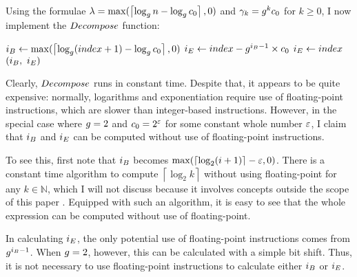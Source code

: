 Using the formulae $\lambda = \max(\left\lceil \log_{g} n - \log_{g} c_0 \right\rceil, 0)$ and $\gamma_k = g^k c_0$ for $k \geq 0$, I now implement the $\FuncDecompose$ function:

\begin{algorithm}[H]
	\caption{\TextHelperFunction}
	\begin{algorithmic}
		\Function{$\FuncDecompose$}{$\ParamIndex$}
			\State $i_B \gets \max(\left\lceil \log_{g} (index + 1) - \log_{g} c_0 \right\rceil, 0)$
				\State $i_E \gets index - g^{i_B - 1} \times c_0$
			\Else
				\State $i_E \gets index$
			\EndIf
			\State \Return $(\LclIndexBuffer,\ \LclIndexElement)$
		\EndFunction
	\end{algorithmic}
\end{algorithm}

Clearly, $\FuncDecompose$ runs in constant time. Despite that, it appears to be quite expensive: normally, logarithms and exponentiation require use of floating-point instructions, which are slower than integer-based instructions. However, in the special case where $g = 2$ and $c_0 = 2^\varepsilon$ for some constant whole number $\varepsilon$, I claim that $i_B$ and $i_E$ can be computed without use of floating-point instructions.

To see this, first note that $i_B$ becomes $\max(\left\lceil \log_2 (i + 1) \right\rceil - \varepsilon, 0)$. There is a constant time algorithm to compute $\left\lceil \log_2 k \right\rceil$ without using floating-point for any $k \in \mathbb{N}$, which I will not discuss because it involves concepts outside the scope of this paper \cite{ceillog2}. Equipped with such an algorithm, it is easy to see that the whole expression can be computed without use of floating-point.

In calculating $i_E$, the only potential use of floating-point instructions comes from $g^{i_B - 1}$. When $g = 2$, however, this can be calculated with a simple bit shift. Thus, it is not necessary to use floating-point instructions to calculate either $i_B$ or $i_E$.